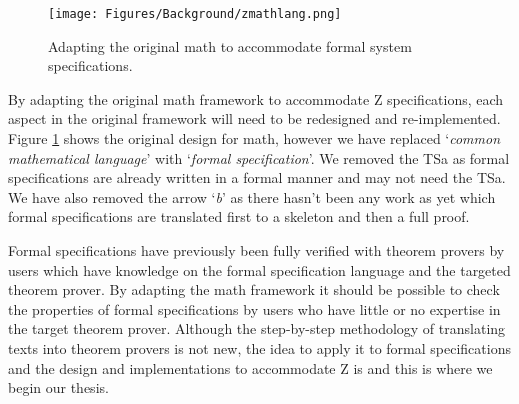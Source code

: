 \begin{figure}[H]
\begin{center}
\texttt{[image: Figures/Background/zmathlang.png]}
\end{center}
\caption{Adapting the original \gls{math} to accommodate formal system specifications. \label{fig:zmathlang}}
\end{figure}

By adapting the original \gls{math} framework to accommodate Z specifications,
each aspect in the original framework will need to be redesigned and
re-implemented. Figure \ref{fig:zmathlang} shows the original design for
\gls{math}, however we have replaced `\emph{common mathematical language}' with
`\emph{formal specification}'. We removed the TSa as formal specifications are
already written in a formal manner and may not need the TSa. We have also
removed the arrow `\emph{b}' as there hasn't been any work as yet which formal
specifications are translated first to a skeleton and then a full proof.

Formal specifications have previously been fully verified with theorem provers
by users which have knowledge on the formal specification language and the
targeted theorem prover. By adapting the \gls{math} framework it should be
possible to check the properties of formal specifications by users who have
little or no expertise in the target theorem prover. Although the step-by-step
methodology of translating texts into theorem provers is not new, the idea to
apply it to formal specifications and the design and implementations to
accommodate Z is and this is where we begin our thesis.
